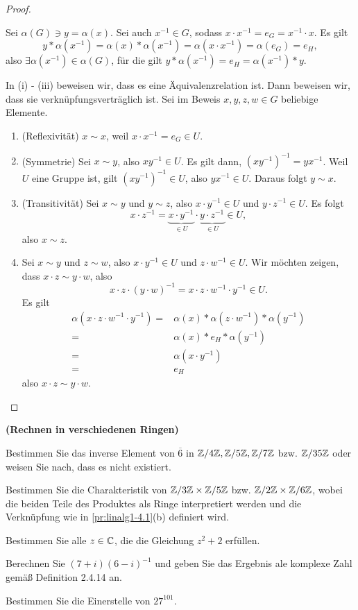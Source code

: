 \begin{proof}
\begin{parts}
\begin{enumerate}
				Sei $\alpha(G)\ni y=\alpha(x)$. Sei auch $x^{-1}\in G$, sodass $x\cdot x^{-1}=e_G=x^{-1}\cdot x$. Es gilt
				\[
					y*\alpha(x^{-1})=\alpha(x)*\alpha(x^{-1})=\alpha(x\cdot x^{-1})=\alpha(e_G)=e_H
				,\]
				also $\exists \alpha(x^{-1})\in \alpha(G)$, f\"{u}r die gilt $y*\alpha(x^{-1})=e_H=\alpha(x^{-1})*y$.
		\end{enumerate}
	\item In (i) - (iii) beweisen wir, dass es eine Äquivalenzrelation ist. Dann beweisen wir, dass sie verknüpfungsverträglich ist. Sei im Beweis $x,y,z,w\in G$ beliebige Elemente.
\begin{enumerate}[label=(\roman*)]
	\item (Reflexivität) $x \sim x$, weil $x\cdot x^{-1}=e_G\in U$.
	\item (Symmetrie) Sei $x\sim y$, also $xy^{-1}\in U$. Es gilt dann, $(xy^{-1})^{-1}=yx^{-1}$. Weil $U$ eine Gruppe ist, gilt $(xy^{-1})^{-1}\in U$, also $yx^{-1}\in U$. Daraus folgt $y\sim x$.
	\item (Transitivität) Sei $x\sim y$ und $y\sim z$, also  $x\cdot y^{-1}\in U$ und $y\cdot z^{-1}\in U$. Es folgt
		\[
			x\cdot z^{-1}=\underbrace{x\cdot y^{-1}}_{\in U}\cdot \underbrace{y\cdot z^{-1}}_{\in U}\in U
		,\]
		also $x\sim z$.
	\item Sei  $x\sim y$ und $z\sim w$, also $x\cdot y^{-1}\in U$ und $z\cdot w^{-1}\in U$. Wir möchten zeigen, dass $x\cdot z\sim y\cdot w$, also
		\[
			x\cdot z\cdot (y \cdot w)^{-1}=x\cdot z \cdot w^{-1}\cdot y^{-1} \in U
		.\] 
		Es gilt
		\begin{align*}
			\alpha(x\cdot z\cdot w^{-1}\cdot y^{-1})=&\alpha(x)*\alpha(z\cdot w^{-1})*\alpha(y^{-1})\\
			=&\alpha(x)*e_H*\alpha(y^{-1})\\
			=& \alpha(x\cdot y^{-1})\\
			=& e_H
		\end{align*}
		also $x\cdot z\sim y\cdot w$.\qedhere
\end{enumerate}
	\end{parts}
\end{proof}
\begin{Problem}
	\textbf{(Rechnen in verschiedenen Ringen)}
	\begin{parts}
	\item Bestimmen Sie das inverse Element von $\overline{6}$ in $\mathbb{Z} / 4\mathbb{Z}, \mathbb{Z} / 5\mathbb{Z}, \mathbb{Z} / 7\mathbb{Z}$ bzw. $\mathbb{Z} / 35\mathbb{Z}$ oder weisen Sie nach, dass es nicht existiert.
	\item Bestimmen Sie die Charakteristik von $\mathbb{Z} / 3\mathbb{Z}\times \mathbb{Z} / 5\mathbb{Z}$ bzw. $\mathbb{Z} / 2\mathbb{Z} \times \mathbb{Z} / 6\mathbb{Z}$, wobei die beiden Teile des Produktes als Ringe interpretiert werden und die Verknüpfung wie in \ref{pr:linalg1-4.1}(b) definiert wird.
	\item Bestimmen Sie alle $z\in \mathbb{C}$, die die Gleichung $z^2+2$ erfüllen.
	\item Berechnen Sie $(7+i)(6-i)^{-1}$ und geben Sie das Ergebnis ale komplexe Zahl gemäß Definition 2.4.14 an.
	\item Bestimmen Sie die Einerstelle von $27^{101}$.
	\end{parts}
\end{Problem}
